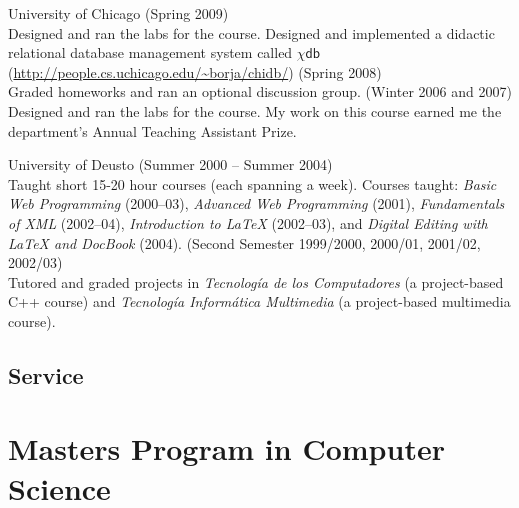 \documentclass{resume}
\begin{document}
\begin{category}{University of Chicago} 
 (Spring 2009)\\
Designed and ran the labs for the course. Designed and implemented a didactic relational database management system called $\chi\textsf{db}$ (\url{http://people.cs.uchicago.edu/~borja/chidb/})
 (Spring 2008)\\
Graded homeworks and ran an optional discussion group.
 (Winter 2006 and 2007)\\
Designed and ran the labs for the course. My work on this course earned me the department's Annual Teaching Assistant Prize.
\end{category}

\begin{category}{University of Deusto} 
 (Summer 2000 -- Summer 2004)\\
Taught short 15-20 hour courses (each spanning a week). Courses taught: \emph{Basic Web Programming} (2000--03), \emph{Advanced Web Programming} (2001), \emph{Fundamentals of XML} (2002--04), \emph{Introduction to \LaTeX} (2002--03), and \emph{Digital Editing with \LaTeX{} and DocBook} (2004).
 (Second Semester 1999/2000, 2000/01, 2001/02, 2002/03)\\
Tutored and graded projects in \emph{Tecnología de los Computadores} (a project-based C++ course) and \emph{Tecnología Informática Multimedia} (a project-based multimedia course).
\end{category}

\pagebreak

\begin{center}
\section*{\huge Service}
\vspace{2ex}
\end{center}

\section*{\hspace{-1cm}Masters Program in Computer Science}
\end{document}
